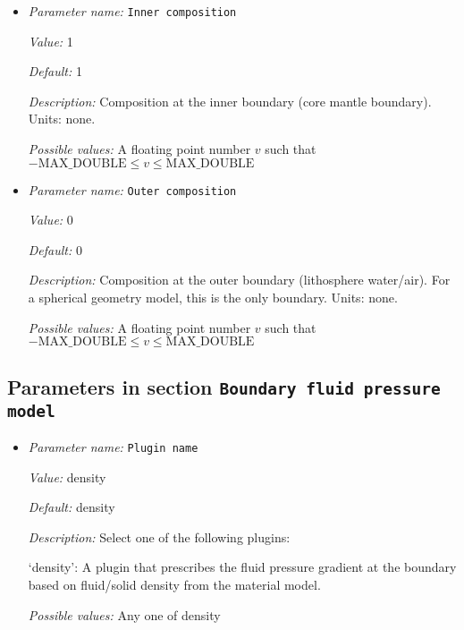 \begin{itemize}
\item {\it Parameter name:} {\tt Inner composition}
\label{parameters:Boundary composition model/Spherical constant/Inner composition}
\label{parameters:Boundary_20composition_20model/Spherical_20constant/Inner_20composition}


{\it Value:} 1


{\it Default:} 1


{\it Description:} Composition at the inner boundary (core mantle boundary). Units: none.


{\it Possible values:} A floating point number $v$ such that $-\text{MAX\_DOUBLE} \leq v \leq \text{MAX\_DOUBLE}$
\item {\it Parameter name:} {\tt Outer composition}
\label{parameters:Boundary composition model/Spherical constant/Outer composition}
\label{parameters:Boundary_20composition_20model/Spherical_20constant/Outer_20composition}


{\it Value:} 0


{\it Default:} 0


{\it Description:} Composition at the outer boundary (lithosphere water/air). For a spherical geometry model, this is the only boundary. Units: none.


{\it Possible values:} A floating point number $v$ such that $-\text{MAX\_DOUBLE} \leq v \leq \text{MAX\_DOUBLE}$
\end{itemize}

\subsection{Parameters in section \tt Boundary fluid pressure model}
\label{parameters:Boundary_20fluid_20pressure_20model}

\begin{itemize}
\item {\it Parameter name:} {\tt Plugin name}
\label{parameters:Boundary fluid pressure model/Plugin name}
\label{parameters:Boundary_20fluid_20pressure_20model/Plugin_20name}


{\it Value:} density


{\it Default:} density


{\it Description:} Select one of the following plugins:

`density': A plugin that prescribes the fluid pressure gradient at the boundary based on fluid/solid density from the material model.


{\it Possible values:} Any one of density
\end{itemize}



